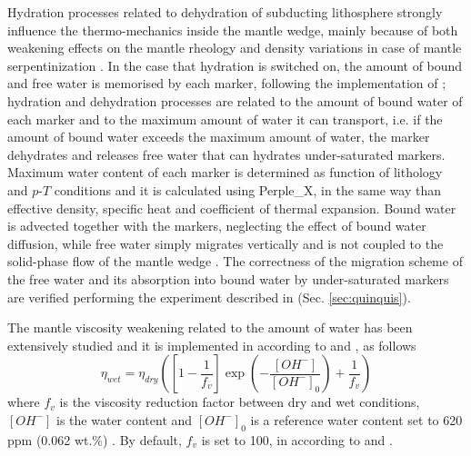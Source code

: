 Hydration processes related to dehydration of subducting lithosphere \citep{Schmidt1998,Liu2007,Faccenda2009,Faccenda2010,Faccenda2014,Rosas2016} strongly
influence the thermo-mechanics inside the mantle wedge, mainly because of both weakening effects on the mantle rheology and density variations in case of mantle serpentinization \citep{Gerya2002,Honda2003,Arcay2005,Roda2010,Regorda2017}. In the case that hydration is switched on, the amount of bound and free water is memorised by each marker, following the implementation of \citet{Quinquis2014}; hydration and dehydration processes are related to the amount of bound water of each marker and to the maximum amount of water it can transport, i.e. if the amount of bound water exceeds the maximum amount of water, the marker dehydrates and releases free water that can hydrates under-saturated markers. Maximum water content of each marker is determined as function of lithology and $p$-$T$ conditions and it is calculated using Perple\_X, in the same way than effective density, specific heat and coefficient of thermal expansion. Bound water is advected together with the markers, neglecting the effect of bound water diffusion, while free water simply migrates vertically and is not coupled to the solid-phase flow of the mantle wedge \citep{Arcay2005,Quinquis2014}. The correctness of the migration scheme of the free water and its absorption into bound
water by under-saturated markers are verified performing the experiment described in \citet{Quinquis2014} (Sec. \ref{sec:quinquis}).

The mantle viscosity weakening related to the amount of water has been extensively studied \citep{Chopra1981,Hirth2003} and it is implemented in according to \citet{Arcay2005} and \citet{Horiuchi2016}, as follows
\begin{equation}\label{eq:wet_visc}
\eta_{wet}=\eta_{dry}\left(\left[1-\frac{1}{f_v}\right]\exp\left(-\frac{[OH^-]}{[OH^-]_0}\right)+\frac{1}{f_v}\right)
\end{equation}
where $f_v$ is the viscosity reduction factor between dry and wet conditions, $[OH^-]$ is the water content and $[OH^-]_0$ is a reference water content set to 620 ppm (0.062 wt.\%) \citep{Arcay2005}. By default, $f_v$ is set to 100, in according to \citet{Arcay2005} and \citet{Horiuchi2016}.